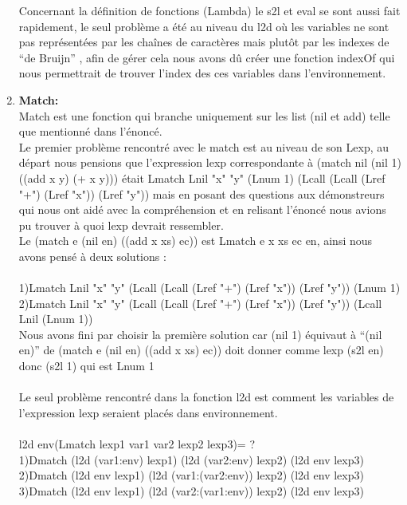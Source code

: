 \documentclass{article}
\begin{document}
\begin{enumerate}
    Concernant la définition de fonctions (Lambda) le s2l et eval se sont aussi fait rapidement, le seul problème a été au niveau du l2d où les variables ne sont pas représentées par les chaînes de caractères mais plutôt par les indexes de  “de Bruijn” , afin de gérer cela nous avons dû créer une fonction indexOf qui nous permettrait de trouver l’index des ces variables dans l’environnement.\\
    
\item    
    \textbf{Match:}\\
    Match est une fonction qui branche uniquement sur les list (nil et add) telle que mentionné dans l’énoncé.\\
    Le premier problème rencontré avec le match est au niveau de son Lexp, au départ nous pensions que l'expression lexp correspondante à (match nil (nil 1) ((add x y) (+ x y))) était Lmatch Lnil "x" "y" (Lnum 1) (Lcall (Lcall (Lref "+") (Lref "x")) (Lref "y")) mais en posant des questions aux démonstreurs qui nous ont aidé avec la compréhension et en relisant l’énoncé nous avions pu trouver à quoi  lexp devrait ressembler.\\
    Le (match e (nil en) ((add x xs) ec)) est Lmatch e x xs ec en, ainsi nous avons pensé à deux solutions :\\
    \\
    1)Lmatch Lnil "x" "y" (Lcall (Lcall (Lref "+") (Lref "x")) (Lref "y")) (Lnum 1)\\
    2)Lmatch Lnil "x" "y" (Lcall (Lcall (Lref "+") (Lref "x")) (Lref "y")) (Lcall Lnil (Lnum 1))\\
    Nous avons fini par choisir la première solution car (nil 1) équivaut à “(nil en)” de (match e (nil en) ((add x xs) ec)) doit donner comme lexp (s2l en) donc (s2l 1) qui est Lnum 1\\
    \\
    Le seul problème rencontré dans la fonction l2d est comment les variables de l’expression lexp seraient placés dans environnement.\\
    \\ l2d env(Lmatch lexp1 var1 var2 lexp2 lexp3)= ?\\
    1)Dmatch (l2d (var1:env) lexp1) (l2d (var2:env) lexp2) (l2d env lexp3)\\
    2)Dmatch (l2d env lexp1) (l2d (var1:(var2:env)) lexp2) (l2d env lexp3)\\
    3)Dmatch (l2d env lexp1) (l2d (var2:(var1:env)) lexp2) (l2d env lexp3)\\ \\

\end{enumerate}
\end{document}
